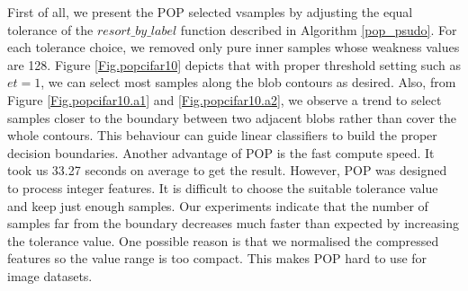 First of all, we present the POP selected  vsamples by adjusting the equal tolerance of the $resort\_by\_label$ function described in Algorithm \ref{pop_psudo}. For each  tolerance choice, we removed only pure inner samples whose weakness values are 128. Figure \ref{Fig.popcifar10} depicts that with proper threshold setting such as $et = 1$, we can select most samples along the blob contours as desired. Also, from Figure \ref{Fig.popcifar10.a1} and \ref{Fig.popcifar10.a2}, we observe a trend to select samples closer to the boundary between two adjacent blobs rather than cover the whole contours. This behaviour can guide linear classifiers to build the proper decision boundaries. Another advantage of POP is the fast compute speed. It took us 33.27 seconds on average to get the result. However, POP was designed to process integer features. It is difficult to choose the suitable tolerance value and keep just enough samples. Our experiments indicate that the number of samples far from the boundary decreases much faster than expected by increasing the tolerance value. One possible reason is that we normalised the compressed features so the value range is too compact. This makes POP hard to use for image datasets. 
   
